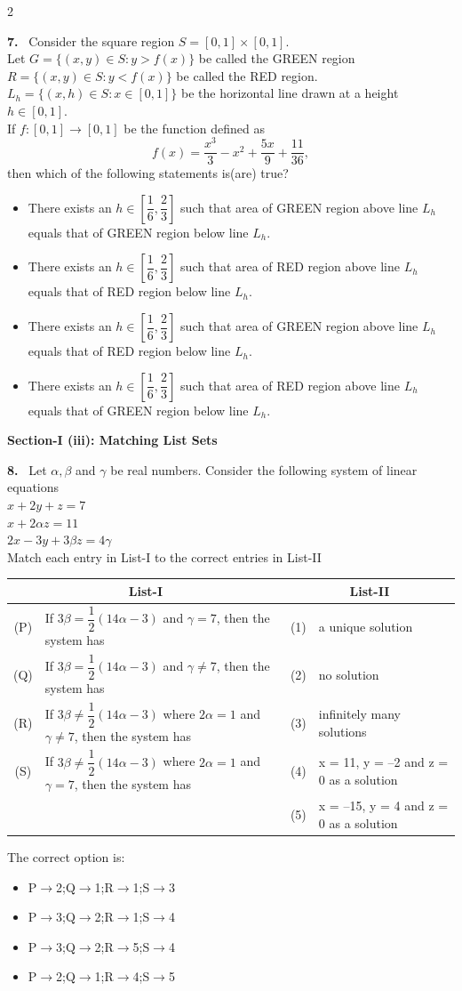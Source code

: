 \documentclass[10pt]{extarticle}
\newcommand{\sect}[1]{\par\smallskip\noindent\textbf{#1}\par}
\newcommand{\qn}[1]{\par\smallskip\noindent\textbf{#1.}~}
\newenvironment{qoptions}{\begin{itemize}[leftmargin=1.8em,itemsep=1pt,topsep=2pt,label={}]}{\end{itemize}}
\newcommand{\opt}[2]{\item[(#1)] #2}
\begin{document}
\begin{multicols}{2}
\qn{7} Consider the square region $S=[0,1]\times[0,1]$.\\
Let $G=\{(x,y)\in S:y>f(x)\}$ be called the GREEN region\\
$R=\{(x,y)\in S:y<f(x)\}$ be called the RED region.\\
$L_h=\{(x,h)\in S:x\in[0,1]\}$ be the horizontal line drawn at a height $h\in[0,1]$.\\
If $f:[0,1]\to[0,1]$ be the function defined as
$$f(x)=\dfrac{x^3}{3}-x^2+\dfrac{5x}{9}+\dfrac{11}{36},$$
then which of the following statements is(are) true?
\begin{qoptions}
\opt{A}{There exists an $h\in\left[\dfrac16,\dfrac23\right]$ such that area of GREEN region above line $L_h$ equals that of GREEN region below line $L_h$.}
\opt{B}{There exists an $h\in\left[\dfrac16,\dfrac23\right]$ such that area of RED region above line $L_h$ equals that of RED region below line $L_h$.}
\opt{C}{There exists an $h\in\left[\dfrac16,\dfrac23\right]$ such that area of GREEN region above line $L_h$ equals that of RED region below line $L_h$.}
\opt{D}{There exists an $h\in\left[\dfrac16,\dfrac23\right]$ such that area of RED region above line $L_h$ equals that of GREEN region below line $L_h$.}
\end{qoptions}

\sect{Section-I (iii): Matching List Sets}

\qn{8} Let $\alpha,\beta$ and $\gamma$ be real numbers. Consider the following system of linear equations\\
$x+2y+z=7$\\
$x+2\alpha z=11$\\
$2x-3y+3\beta z=4\gamma$\\
Match each entry in List-I to the correct entries in List-II
\begin{center}
\begin{tabular}{|c|p{3.6cm}|c|p{2.3cm}|}
\hline
\multicolumn{2}{|c|}{List-I} & \multicolumn{2}{c|}{List-II} \\
\hline
(P) & If $3\beta=\dfrac12(14\alpha-3)$ and $\gamma=7$, then the system has & (1) & a unique solution \\
\hline
(Q) & If $3\beta=\dfrac12(14\alpha-3)$ and $\gamma\ne7$, then the system has & (2) & no solution \\
\hline
(R) & If $3\beta\ne\dfrac12(14\alpha-3)$ where $2\alpha=1$ and $\gamma\ne7$, then the system has & (3) & infinitely many solutions \\
\hline
(S) & If $3\beta\ne\dfrac12(14\alpha-3)$ where $2\alpha=1$ and $\gamma=7$, then the system has & (4) & x = 11, y = --2 and z = 0 as a solution \\
\hline
 & & (5) & x = --15, y = 4 and z = 0 as a solution \\
\hline
\end{tabular}
\end{center}
The correct option is:
\begin{qoptions}
\opt{A}{P$\to$2;Q$\to$1;R$\to$1;S$\to$3}
\opt{B}{P$\to$3;Q$\to$2;R$\to$1;S$\to$4}
\opt{C}{P$\to$3;Q$\to$2;R$\to$5;S$\to$4}
\opt{D}{P$\to$2;Q$\to$1;R$\to$4;S$\to$5}
\end{qoptions}


\end{multicols}
\end{document}
